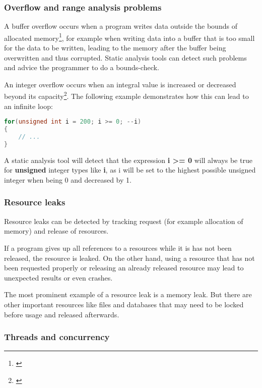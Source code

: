 \subsubsection{Overflow and range analysis problems}

A buffer overflow occurs when a program writes data outside the bounds of allocated memory\footnote{\citep[175]{SecureProgramming}}, for example when writing data into a buffer that is too small for the data to be written, leading to the memory after the buffer being overwritten and thus corrupted. Static analysis tools can detect such problems and advice the programmer to do a bounds-check.

An integer overflow occurs when an integral value is increased or decreased beyond its capacity\footnote{\citep[235]{SecureProgramming}}. The following example demonstrates how this can lead to an infinite loop:

\begin{lstlisting}[language=C++, caption=Integer ''underflow'' in C++]
for(unsigned int i = 200; i >= 0; --i)
{
	// ...
}
\end{lstlisting}

A static analysis tool will detect that the expression \textbf{i \textgreater= 0} will always be true for \textbf{unsigned} integer types like \textbf{i}, as i will be set to the highest possible unsigned integer when being 0 and decreased by 1.

\subsubsection{Resource leaks}

Resource leaks can be detected by tracking request (for example allocation of memory) and release of resources.

If a program gives up all references to a resources while it is has not been released, the resource is leaked. On the other hand, using a resource that has not been requested properly or releasing an already released resource may lead to unexpected results or even crashes.

The most prominent example of a resource leak is a memory leak. But there are other important resources like files and databases that may need to be locked before usage and released afterwards.

\subsubsection{Threads and concurrency}

